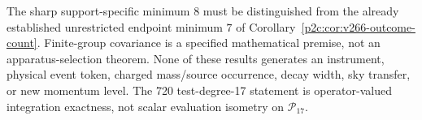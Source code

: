 \documentclass[12pt,a4paper]{article}
\begin{document}
\begin{remark}
The sharp support-specific minimum $8$ must be distinguished from the
already established unrestricted endpoint minimum $7$ of
Corollary~\ref{p2c:cor:v266-outcome-count}. Finite-group covariance is a
specified mathematical premise, not an apparatus-selection theorem.
None of these results generates an instrument, physical event token,
charged mass/source occurrence, decay width, sky transfer, or new
momentum level. The 720 test-degree-17 statement is operator-valued
integration exactness, not scalar evaluation isometry on $\mathcal P_{17}$.
\end{remark}
\end{document}
